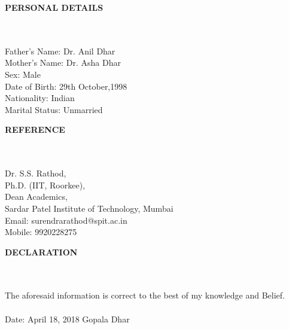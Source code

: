 \documentclass[a4paper,10pt]{article}
\newcommand{\lsep}{-0.5cm}
\newcommand{\resheading}[1]{{\small \colorbox{mygrey}{\begin{minipage}{0.975\textwidth}{\textbf{#1 \vphantom{p\^{E}}}}\end{minipage}}}}
\begin{document}
\resheading{\textbf{PERSONAL DETAILS} }\\\\[\lsep]

\indent Father's Name:   Dr. Anil Dhar\\ 
\indent Mother's Name:   Dr. Asha Dhar\\
\indent Sex:   Male\\
\indent Date of Birth:   29th October,1998\\
\indent Nationality:   Indian\\
\indent Marital Status:   Unmarried\\

\resheading{\textbf{REFERENCE} }\\\\[\lsep]

\indent Dr. S.S. Rathod, \\
\indent Ph.D. (IIT, Roorkee), \\
\indent Dean Academics, \\
\indent Sardar Patel Institute of Technology, Mumbai\\
\indent Email: surendra\textunderscore rathod@spit.ac.in\\
\indent Mobile: 9920228275\\

\resheading{\textbf{DECLARATION} }\\\\[\lsep]

\indent The aforesaid information is correct to the best of my knowledge and Belief.\\\\

\indent  Date: April 18, 2018 \hfill Gopala Dhar
\end{document}
